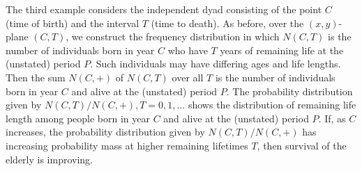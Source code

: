 \documentclass{bmcart}
\begin{document}
The third example considers the independent dyad consisting of the point $C$ (time of birth)
and the interval $T$ (time to death).
As before, over the $(x,y)$-plane $(C,T)$, we construct the frequency distribution in which
$N(C,T)$ is the number of individuals born in year $C$ who have $T$ 
years of remaining life at the (unstated) period $P$.
Such individuals may have differing ages and life lengths.
Then the sum $N(C,+)$ of $N(C,T)$ over all $T$ is the number of individuals born in year $C$
and alive at the (unstated) period $P$.
The probability distribution given by $N(C,T)/N(C,+), T=0, 1, \ldots$
shows the distribution of remaining life length among people born in year $C$
and alive at the (unstated) period $P$.
If, as $C$ increases, the probability distribution given by $N(C,T)/N(C,+)$ has increasing probability mass
at higher remaining lifetimes $T$, then survival of the elderly is improving.


%


\end{document}
